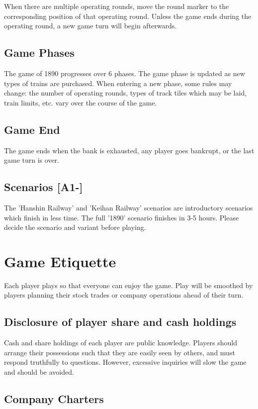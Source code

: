 \documentclass{article}
\begin{document}
\begin{CJK}{UTF8}{min}
\begin{multicols}{2}
When there are multiple operating rounds, move the round marker to the
corresponding position of that operating round. Unless the game ends during
the operating round, a new game turn will begin afterwards.



\subsection{Game Phases}
The game of 1890 progresses over 6 phases. The game phase is updated
as new types of trains are purchased. When entering a new phase, some
rules may change: the number of operating rounds, types of track tiles
which may be laid, train limits, etc. vary over the course of the
game.


\subsection{Game End}
The game ends when the bank is exhausted, any player goes bankrupt,
or the last game turn is over.


\subsection{Scenarios [A1-]}
The 'Hanshin Railway' and 'Keihan Railway' scenarios are introductory
scenarios which finish in less time. The full '1890' scenario finishes
in 3-5 hours. Please decide the scenario and variant before playing.


\section{Game Etiquette}
Each player plays so that everyone can enjoy the game. Play will be
smoothed by players planning their stock trades or company operations
ahead of their turn.


\subsection{Disclosure of player share and cash holdings}
Cash and share holdings of each player are public knowledge. Players
should arrange their possessions such that they are easily seen by
others, and must respond truthfully to questions. However, excessive
inquiries will slow the game and should be avoided.


\subsection{Company Charters}


\end{multicols}
\end{CJK}
\end{document}
